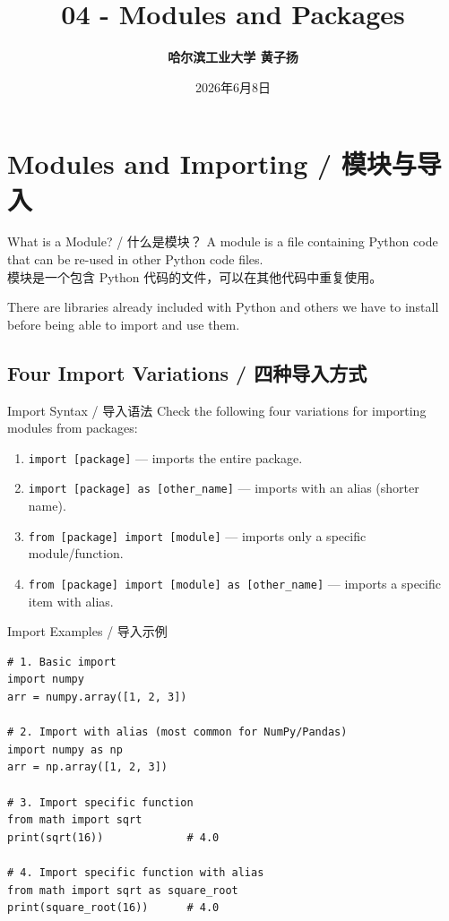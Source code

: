 \documentclass[11pt,a4paper]{article}
\title{\Huge \bfseries 04 - Modules and Packages}
\author{\Large \textbf{哈尔滨工业大学 \quad 黄子扬}}
\date{2026年6月8日}
\begin{document}
\maketitle
\tableofcontents
\newpage

\section{Modules and Importing / 模块与导入}

\begin{concept}{What is a Module? / 什么是模块？}
    A module is a file containing Python code that can be re-used in other Python code files. \\
    模块是一个包含 Python 代码的文件，可以在其他代码中重复使用。

    There are libraries already included with Python and others we have to install before being able to import and use them.
\end{concept}

\subsection{Four Import Variations / 四种导入方式}

\begin{concept}{Import Syntax / 导入语法}
    Check the following four variations for importing modules from packages:
    \begin{enumerate}[itemsep=0.5em]
        \item \texttt{import [package]} — imports the entire package.
        \item \texttt{import [package] as [other\_name]} — imports with an alias (shorter name).
        \item \texttt{from [package] import [module]} — imports only a specific module/function.
        \item \texttt{from [package] import [module] as [other\_name]} — imports a specific item with alias.
    \end{enumerate}
\end{concept}

\begin{examplebox}{Import Examples / 导入示例}
\begin{lstlisting}
# 1. Basic import
import numpy
arr = numpy.array([1, 2, 3])

# 2. Import with alias (most common for NumPy/Pandas)
import numpy as np
arr = np.array([1, 2, 3])

# 3. Import specific function
from math import sqrt
print(sqrt(16))             # 4.0

# 4. Import specific function with alias
from math import sqrt as square_root
print(square_root(16))      # 4.0
\end{lstlisting}
\end{examplebox}
\end{document}
